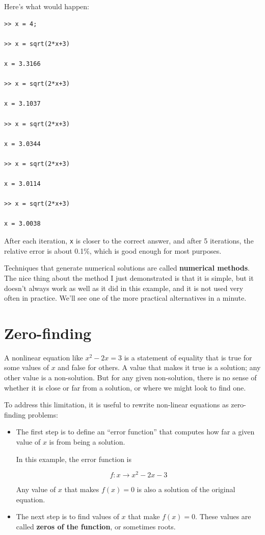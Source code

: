 \documentclass{book}
\begin{document}
Here's what would happen:

\begin{verbatim}
>> x = 4;

>> x = sqrt(2*x+3)

x = 3.3166

>> x = sqrt(2*x+3)

x = 3.1037

>> x = sqrt(2*x+3)

x = 3.0344

>> x = sqrt(2*x+3)

x = 3.0114

>> x = sqrt(2*x+3)

x = 3.0038
\end{verbatim}

After each iteration, {\tt x} is closer to the correct answer,
and after 5 iterations, the relative error is about 0.1\%, which
is good enough for most purposes.

Techniques that generate numerical solutions are called
{\bf numerical methods}.  The nice thing about the method I
just demonstrated is that it is simple, but it doesn't always
work as well as it did in this example, and it is not used
very often in practice.  We'll see one of
the more practical alternatives in a minute.




\section{Zero-finding}
\label{zero}

A nonlinear equation like $x^2 - 2x = 3$ is a statement of
equality that is true for some values of $x$ and false for
others.  A value that makes it true is a solution;
any other value is a non-solution.  But for any given non-solution,
there is no sense of whether it is close or far from a solution,
or where we might look to find one.

To address this limitation, it is useful to
rewrite non-linear equations as zero-finding problems:

\begin{itemize}

\item The first step is to define
an ``error function'' that computes how far
a given value of $x$ is from being a solution.

In this example, the error function is

\begin{equation}
f : x \to x^2 - 2x -3
\end{equation}

Any value of $x$ that makes $f(x) = 0$ is also a solution
of the original equation.

\item The next step is to find values of $x$ that make
$f(x) = 0$.  These values are called {\bf zeros of the
function}, or sometimes roots.

\end{itemize}
\end{document}
